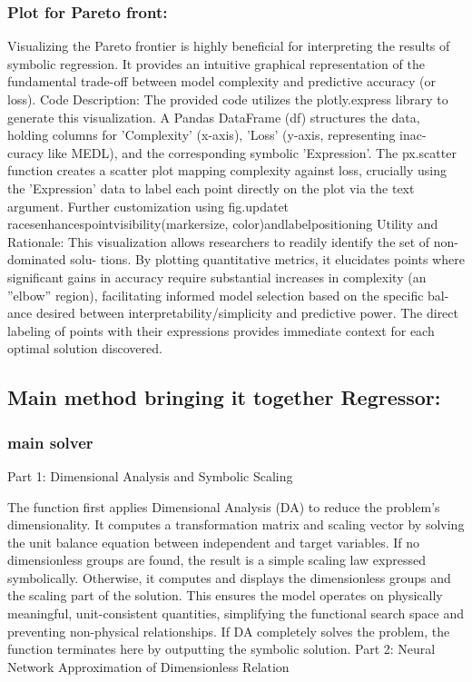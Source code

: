 \documentclass{article}
\begin{document}
{\subsubsection{Plot for Pareto front:}

Visualizing the Pareto frontier is highly beneficial for interpreting the results of symbolic regression. It provides
an intuitive graphical representation of the fundamental trade-off between model complexity and predictive
accuracy (or loss).
Code Description: The provided code utilizes the plotly.express library to generate this visualization. A Pandas
DataFrame (df) structures the data, holding columns for ’Complexity’ (x-axis), ’Loss’ (y-axis, representing inac-
curacy like MEDL), and the corresponding symbolic ’Expression’. The px.scatter function creates a scatter plot
mapping complexity against loss, crucially using the ’Expression’ data to label each point directly on the plot via
the text argument. Further customization using fig.updatet racesenhancespointvisibility(markersize, color)andlabelpositioning
Utility and Rationale: This visualization allows researchers to readily identify the set of non-dominated solu-
tions. By plotting quantitative metrics, it elucidates points where significant gains in accuracy require substantial
increases in complexity (an ”elbow” region), facilitating informed model selection based on the specific bal-
ance desired between interpretability/simplicity and predictive power. The direct labeling of points with their
expressions provides immediate context for each optimal solution discovered.\\ 

\subsection{Main method bringing it together Regressor: }

\subsubsection{main solver}

Part 1: Dimensional Analysis and Symbolic Scaling

The function first applies Dimensional Analysis (DA) to reduce the problem’s dimensionality. It computes a transformation matrix and scaling vector by solving the unit balance equation between independent and target variables. If no dimensionless groups are found, the result is a simple scaling law expressed symbolically. Otherwise, it computes and displays the dimensionless groups and the scaling part of the solution. This ensures the model operates on physically meaningful, unit-consistent quantities, simplifying the functional search space and preventing non-physical relationships. If DA completely solves the problem, the function terminates here by outputting the symbolic solution.
Part 2: Neural Network Approximation of Dimensionless Relation

}
\end{document}
